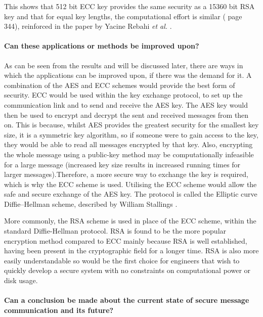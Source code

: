 \documentclass[a4paper,12pt]{report}
\begin{document}
This shows that 512 bit ECC key provides the same security as a 15360 bit RSA key and that for equal key lengths, the computational effort is similar (\cite{willstallings} page 344), reinforced in the paper by Yacine Rebahi \textit{et al.} \cite{eccbetter}.

\paragraph{Can these applications or methods be improved upon?}

As can be seen from the results and will be discussed later, there are ways in which the applications can be improved upon, if there was the demand for it. A combination of the AES and ECC schemes would provide the best form of security. ECC would be used within the key exchange protocol, to set up the communication link and to send and receive the AES key. The AES key would then be used to encrypt and decrypt the sent and received messages from then on. This is because, whilst AES provides the greatest security for the smallest key size, it is a symmetric key algorithm, so if someone were to gain access to the key, they would be able to read all messages encrypted by that key. Also, encrypting the whole message using a public-key method may be computationally infeasible for a large message (increased key size results in increased running times for larger messages).Therefore, a more secure way to exchange the key is required, which is why the ECC scheme is used. Utilising the ECC scheme would allow the safe and secure exchange of the AES key. The protocol is called the Elliptic curve Diffie–Hellman scheme, described by William Stallings \cite{willstallings}.

More commonly, the RSA scheme is used in place of the ECC scheme, within the standard Diffie-Hellman protocol. RSA is found to be the more popular encryption method compared to ECC mainly because RSA is well established, having been present in the cryptographic field for a longer time. RSA is also more easily understandable so would be the first choice for engineers that wish to quickly develop a secure system with no constraints on computational power or disk usage. 

\paragraph{Can a conclusion be made about the current state of secure message communication and its future?}
\end{document}
